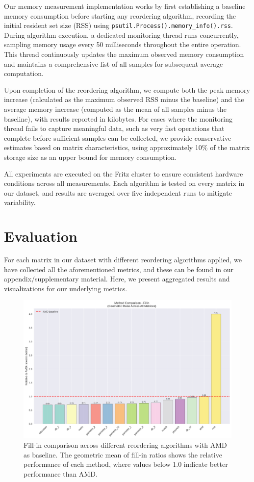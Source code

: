 Our memory measurement implementation works by first establishing a baseline memory consumption before starting any reordering algorithm, recording the initial resident set size (RSS) using \texttt{psutil.Process().memory\_info().rss}. During algorithm execution, a dedicated monitoring thread runs concurrently, sampling memory usage every 50 milliseconds throughout the entire operation. This thread continuously updates the maximum observed memory consumption and maintains a comprehensive list of all samples for subsequent average computation.

Upon completion of the reordering algorithm, we compute both the peak memory increase (calculated as the maximum observed RSS minus the baseline) and the average memory increase (computed as the mean of all samples minus the baseline), with results reported in kilobytes. For cases where the monitoring thread fails to capture meaningful data, such as very fast operations that complete before sufficient samples can be collected, we provide conservative estimates based on matrix characteristics, using approximately 10\% of the matrix storage size as an upper bound for memory consumption.

All experiments are executed on the Fritz cluster to ensure consistent hardware conditions across all measurements. Each algorithm is tested on every matrix in our dataset, and results are averaged over five independent runs to mitigate variability. 

\section{Evaluation}

For each matrix in our dataset with different reordering algorithms applied, we have collected all the aforementioned metrics, and these can be found in our appendix/supplementary material. Here, we present aggregated results and visualizations for our underlying metrics.

\begin{figure}[h]
\centering
\includegraphics[width=\textwidth]{fig/res/fillin_method_comparison.png}
\caption{Fill-in comparison across different reordering algorithms with AMD as baseline. The geometric mean of fill-in ratios shows the relative performance of each method, where values below 1.0 indicate better performance than AMD.}
\label{fig:fillin-comparison}
\end{figure}


